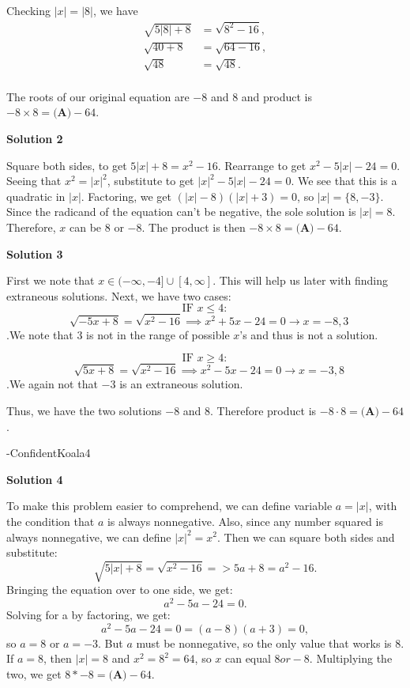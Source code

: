 \begin{enumerate}
 Checking $|x|=|8|$, we have
 \begin{align*} \sqrt{5|8|+8}&=\sqrt{8^2-16}, \\ \sqrt{40+8}&=\sqrt{64-16}, \\ \sqrt{48}&=\sqrt{48}.\\ \end{align*}


 The roots of our original equation are $-8$ and $8$ and product is $-8 \times 8 = \boxed{\textbf{(A)} -64}$.

 



\textbf{Solution 2}

Square both sides, to get $5|x| + 8 = x^2-16$. Rearrange to get $x^2 - 5|x| - 24 = 0$. Seeing that $x^2 = |x|^2$, substitute to get $|x|^2 - 5|x| - 24 = 0$. We see that this is a quadratic in $|x|$. Factoring, we get $(|x|-8)(|x|+3) = 0$, so $|x| = \{8,-3\}$. Since the radicand of the equation can't be negative, the sole solution is $|x| = 8$. Therefore, $x$ can be $8$ or $-8$. The product is then $-8 \times 8 = \boxed{\textbf{(A)} -64}$.

 



\textbf{Solution 3}

First we note that $x \in (-\infty,-4] \cup [4,\infty]$. This will help us later with finding extraneous solutions. Next, we have two cases:
 \[\text{IF } x\leq 4:\]
 \[\text{ } \sqrt{-5x+8} = \sqrt{x^2-16} \implies x^2+5x-24=0 \rightarrow x = -8,3\].We note that $3$ is not in the range of possible $x$'s and thus is not a solution.

 
 \[\text{IF } x\geq 4:\]
 \[\text{ } \sqrt{5x+8} = \sqrt{x^2-16} \implies x^2-5x-24=0 \rightarrow x = -3,8\].We again not that $-3$ is an extraneous solution.

 Thus, we have the two solutions $-8$ and $8$. Therefore product is $-8 \cdot 8 = \boxed{\textbf{(A)} -64}$.

 -ConfidentKoala4

 



\textbf{Solution 4}

To make this problem easier to comprehend, we can define variable $a = |x|$, with the condition that $a$ is always nonnegative. Also, since any number squared is always nonnegative, we can define $|x|^2 = x^2$. Then we can square both sides and substitute:
 \[\sqrt{5 | x | + 8} = \sqrt{x^2 - 16} => 5a + 8 = a^2 - 16.\]Bringing the equation over to one side, we get:
 \[a^2 - 5a - 24 = 0.\]Solving for a by factoring, we get:
 \[a^2 - 5a - 24 = 0 = (a - 8)(a + 3) = 0,\]so $a = 8$ or $a = -3$. But $a$ must be nonnegative, so the only value that works is $8$. If $a = 8$, then $|x| = 8$ and $x^2 = 8^2 = 64$, so $x$ can equal $8 or -8$. Multiplying the two, we get $8 * -8 = \boxed{\textbf{(A)} -64}$.


\end{enumerate}
